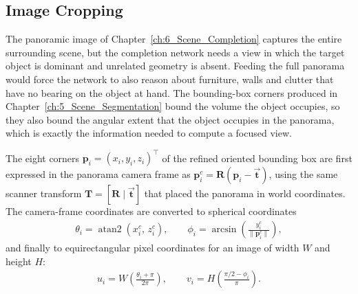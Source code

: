 \subsection{Image Cropping}
\label{sec:7_image_crop}

The panoramic image of Chapter~\ref{ch:6_Scene_Completion} captures the entire surrounding scene, but the completion network needs a view in which the target object is dominant and unrelated geometry is absent. Feeding the full panorama would force the network to also reason about furniture, walls and clutter that have no bearing on the object at hand. The bounding-box corners produced in Chapter~\ref{ch:5_Scene_Segmentation} bound the volume the object occupies, so they also bound the angular extent that the object occupies in the panorama, which is exactly the information needed to compute a focused view.

The eight corners $\mathbf{p}_i = (x_i, y_i, z_i)^\top$ of the refined oriented bounding box are first expressed in the panorama camera frame as $\mathbf{p}_i^c = \mathbf{R}(\mathbf{p}_i - \vec{\mathbf{t}})$, using the same scanner transform $\mathbf{T} = [\mathbf{R} \mid \vec{\mathbf{t}}]$ that placed the panorama in world coordinates. The camera-frame coordinates are converted to spherical coordinates
\begin{equation}
    \label{eq:7_spherical}
    \begin{gathered}
    \theta_i = \operatorname{atan2}(x_i^c,\, z_i^c), \qquad
    \phi_i = \arcsin\!\left(\frac{y_i^c}{\|\mathbf{p}_i^c\|}\right),
    \end{gathered}
\end{equation}
and finally to equirectangular pixel coordinates for an image of width $W$ and height $H$:
\begin{equation}
    \label{eq:7_equirectangular}
    \begin{gathered}
    u_i = W \left( \frac{\theta_i + \pi}{2\pi} \right), \qquad
    v_i = H \left( \frac{\pi/2 - \phi_i}{\pi} \right).
    \end{gathered}
\end{equation}

